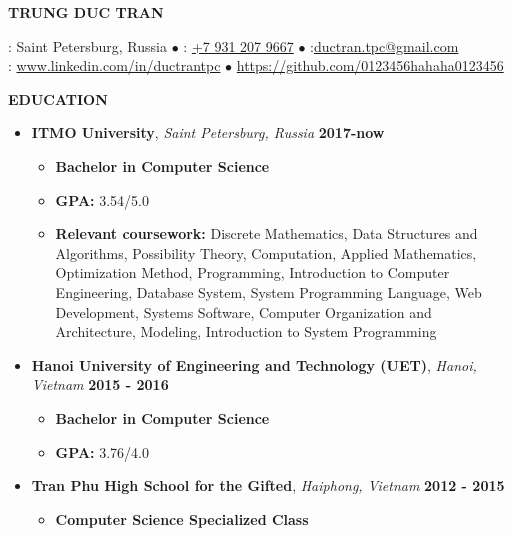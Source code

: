 \documentclass{article}
\newcommand{\cat}[1]{
	\par \noindent\ignorespaces%
	\colorbox[rgb]{0.9, 0.9, 0.9}
	{\begin{minipage}
			[c][1.2\height][c]{\linewidth}{\large\bf #1}
	\end{minipage}}%
}
\begin{document}
	\begin{center}
		{\Large \bf TRUNG DUC TRAN}\\
	\end{center}
	
	\begin{center}
		\Hut: Saint Petersburg, Russia $\bullet$ 
		\phone: \href{tel:+7 931 207 9667}{+7 931 207 9667} $\bullet$
		\Letter:\href{mailto:ductran.tpc@gmail.com}{ductran.tpc@gmail.com}
		\\
		\Mundus: \url{www.linkedin.com/in/ductrantpc} $\bullet$ \url{https://github.com/0123456hahaha0123456}
	\end{center}
	
  
  
	\cat{EDUCATION}
	\begin{itemize}
		\item
		{
			\textbf{ITMO University}{, \emph{Saint Petersburg, Russia}}
			\hfill
			\textbf{2017-now} 
			\begin{itemize}
			    \item \textbf{Bachelor in Computer Science}
			    \item \textbf{GPA:} 3.54/5.0
			    \item \textbf{Relevant coursework:} Discrete Mathematics, Data Structures and Algorithms, Possibility Theory, Computation, Applied Mathematics, Optimization Method, Programming, Introduction to Computer Engineering, Database System, System Programming Language, Web Development, Systems Software, Computer Organization and Architecture, Modeling, Introduction to System Programming 
			\end{itemize}
		}
		\item
    	{
			\textbf{Hanoi University of Engineering and Technology (UET)}{, \emph{Hanoi, Vietnam}}
			\hfill
			\textbf{2015 - 2016}
			\begin{itemize}
			    \item \textbf{Bachelor in Computer Science}
			    \item \textbf{GPA:} 3.76/4.0
			\end{itemize}
		}
		\item
    	{
			\textbf{Tran Phu High School for the Gifted}{, \emph{Haiphong, Vietnam}}
			\hfill
			\textbf{2012 - 2015}
			\begin{itemize}
			    \item \textbf{Computer Science Specialized Class}
			\end{itemize}
		}
		
	\end{itemize}
	
\end{document}
